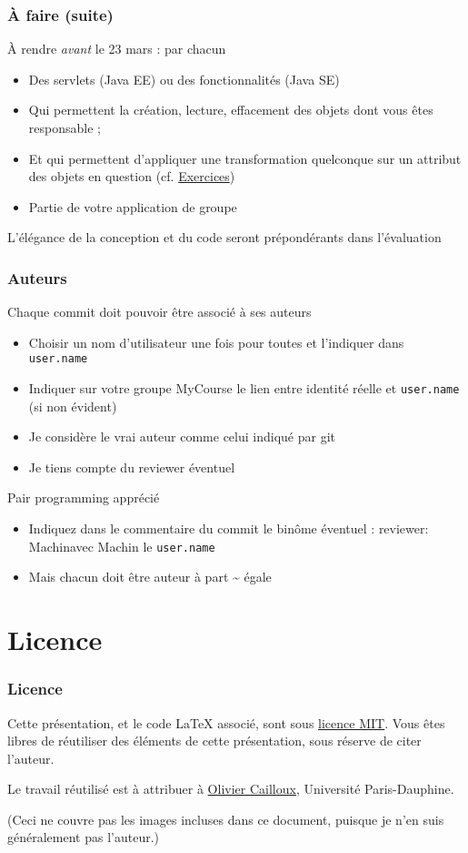 \documentclass[english, french]{beamer}
\begin{document}
\begin{frame}
	\frametitle{À faire (suite)}
	\begin{block}{À rendre \emph{avant} le 23 mars : par chacun}
		\begin{itemize}
			\item Des servlets (Java EE) ou des fonctionnalités (Java SE)
			\item Qui permettent la création, lecture, effacement des objets dont vous êtes responsable ;
			\item Et qui permettent d’appliquer une transformation quelconque sur un attribut des objets en question (cf. \hyperlink{Exercices}{Exercices})
			\item Partie de votre application de groupe
		\end{itemize}
	\end{block}
	L’élégance de la conception et du code seront prépondérants dans l’évaluation
\end{frame}

\begin{frame}
	\frametitle{Auteurs}
	Chaque commit doit pouvoir être associé à ses auteurs
	\begin{itemize}
		\item Choisir un nom d’utilisateur \alert{une fois pour toutes} et l’indiquer dans \texttt{user.name}
		\item Indiquer sur votre groupe MyCourse le lien entre identité réelle et \texttt{user.name} (si non évident)
		\item Je considère le vrai auteur comme celui indiqué par git
		\item Je tiens compte du reviewer éventuel
	\end{itemize}
	Pair programming apprécié
	\begin{itemize}
		\item Indiquez dans le commentaire du commit le binôme éventuel : \og\alert{reviewer: Machin}\fg avec Machin le \texttt{user.name}
		\item Mais chacun doit être auteur à part \sim{} égale
	\end{itemize}
\end{frame}

\appendix
\AtBeginSection{
}
\section{Licence}
\begin{frame}
	\frametitle{Licence}
	Cette présentation, et le code LaTeX associé, sont sous \href{http://opensource.org/licenses/MIT}{licence MIT}. Vous êtes libres de réutiliser des éléments de cette présentation, sous réserve de citer l’auteur.
	
	Le travail réutilisé est à attribuer à \href{http://www.lamsade.dauphine.fr/~ocailloux/}{Olivier Cailloux}, Université Paris-Dauphine.
	
	\small{(Ceci ne couvre pas les images incluses dans ce document, puisque je n’en suis généralement pas l’auteur.)}
\end{frame}
\end{document}
